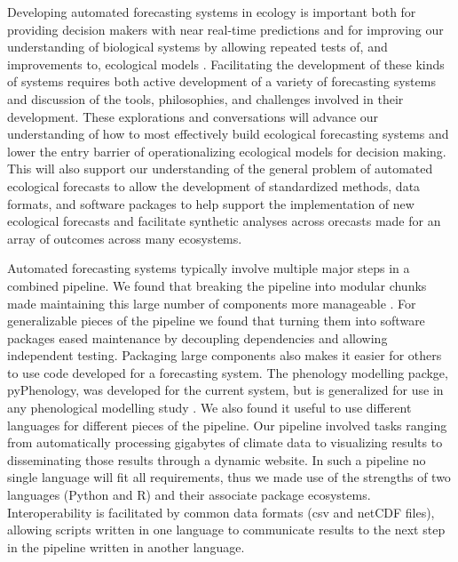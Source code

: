 Developing automated forecasting systems in ecology is important both for providing decision makers with near real-time predictions and for improving our understanding of biological systems by allowing repeated tests of, and improvements to, ecological models \citep{dietze2018, welch2019, white2018}. Facilitating the development of these kinds of systems requires both active development of a variety of forecasting systems and discussion of the tools, philosophies, and challenges involved in their development. These explorations and conversations will advance our understanding of how to most effectively build ecological forecasting systems and lower the entry barrier of operationalizing ecological models for decision making. This will also support our understanding of the general problem of automated ecological forecasts to allow the development of standardized methods, data formats, and software packages to help support the implementation of new ecological forecasts and facilitate synthetic analyses across orecasts made for an array of outcomes across many ecosystems. 

Automated forecasting systems typically involve multiple major steps in a combined pipeline. We found that breaking the pipeline into modular chunks made maintaining this large number of components more manageable \citep{welch2019, white2018}. For generalizable pieces of the pipeline we found that turning them into software packages eased maintenance by decoupling dependencies and allowing independent testing. Packaging large components also makes it easier for others to use code developed for a forecasting system. The phenology modelling packge, pyPhenology, was developed for the current system, but is generalized for use in any phenological modelling study \citep{taylor2018a}. We also found it useful to use different languages for different pieces of the pipeline. Our pipeline involved tasks ranging from automatically processing gigabytes of climate data to visualizing results to disseminating those results through a dynamic website. In such a pipeline no single language will fit all requirements, thus we made use of the strengths of two languages (Python and R) and their associate package ecosystems. Interoperability is facilitated by common data formats (csv and netCDF files), allowing scripts written in one language to communicate results to the next step in the pipeline written in another language. 

